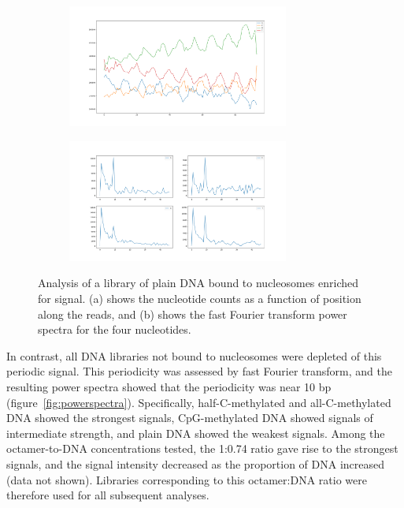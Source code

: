 \documentclass[parskip=full, numbers=noenddot]{scrreprt}
\begin{document}
\begin{figure}[htb]
  \centering
  \begin{subfigure}[htb]{0.8\textwidth}
    \centering
    \includegraphics[width=0.8\textwidth]{enriched-counts}
    \caption{}
    \label{fig:enriched_counts}
  \end{subfigure}
  \begin{subfigure}[htb]{0.8\textwidth}
    \centering
    \includegraphics[width=0.8\textwidth]{enriched-power}
    \caption{}
    \label{fig:enriched_power}
  \end{subfigure}
  \caption{Analysis of a library of plain DNA bound to nucleosomes enriched for signal. (a) shows the nucleotide counts as a function of position along the reads, and (b) shows the fast Fourier transform power spectra for the four nucleotides.}
  \label{fig:enriched}
\end{figure}

In contrast, all DNA libraries not bound to nucleosomes were depleted of this periodic signal.  This periodicity was assessed by fast Fourier transform, and the resulting power spectra showed that the periodicity was near 10 bp (figure~\ref{fig:powerspectra}).  Specifically, half-C-methylated and all-C-methylated DNA showed the strongest signals, %
CpG-methylated DNA showed signals of intermediate strength, and plain DNA showed the weakest signals.  Among the octamer-to-DNA concentrations tested, the 1:0.74 ratio gave rise to the strongest signals, and the signal intensity decreased as the proportion of DNA increased (data not shown).  Libraries corresponding to this octamer:DNA ratio were therefore used for all subsequent analyses.
\end{document}
